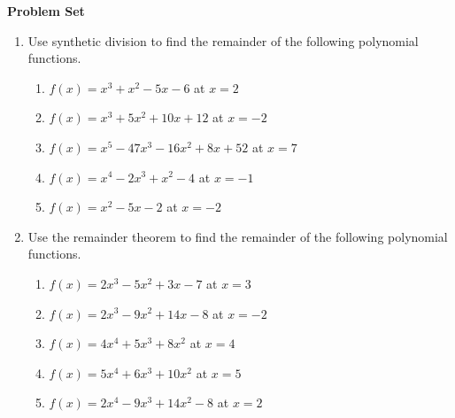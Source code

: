 \textbf{Problem Set}

\vspce
\begin{enumerate}[label = \Alph*. ]

\item 
Use synthetic division to find the remainder of the following polynomial functions. 


\begin{enumerate}[label = \arabic*. ]

\item \hspce \hspce $f(x) = x^3+x^2-5x-6$ at $x = 2$ 
\vspce
\item \hspce \hspce $f(x) = x^3+5x^2+10x+12$  at $x = -2$ 
\vspce
\item \hspce \hspce $f(x) = x^5-47x^3-16x^2+8x+52$ at $x = 7$ 
\vspce
\item \hspce \hspce $f(x) = x^4-2x^3+x^2-4$ at $x = -1$ 
\vspce
\item \hspce \hspce $f(x) = x^2-5x-2$ at $x = -2$ 


\end{enumerate}

\item Use the remainder theorem  to find the remainder of the following polynomial functions. 

\begin{enumerate}[label = \arabic*. ]
\item \hspce \hspce $f(x) = 2x^3-5x^2+3x-7$ at $x = 3$ 
\vspce
\item \hspce \hspce $f(x) = 2x^3-9x^2+14x-8$ at $x = -2$ 
\vspce
\item \hspce \hspce $f(x) = 4x^4+5x^3+8x^2$ at $x = 4$ 
\vspce
\item \hspce \hspce $f(x) = 5x^4+6x^3+10x^2$ at $x = 5$ 
\vspce
\item \hspce \hspce $f(x) = 2x^4-9x^3+14x^2-8$ at $x = 2$ 


\end{enumerate} 
 



\end{enumerate}